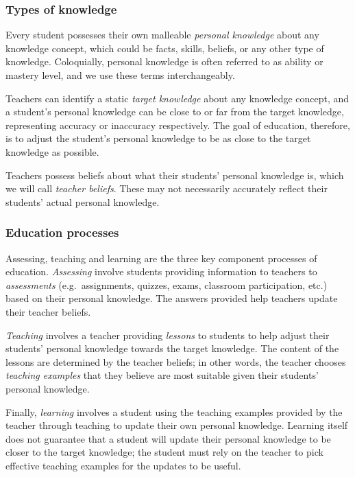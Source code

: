 \documentclass[10pt, letterpaper]{article}
\begin{document}
\subsubsection{Types of knowledge}\label{types-of-knowledge}

Every student possesses their own malleable \emph{personal knowledge}
about any knowledge concept, which could be facts, skills, beliefs, or
any other type of knowledge. Coloquially, personal knowledge is often
referred to as ability or mastery level, and we use these terms
interchangeably.

Teachers can identify a static \emph{target knowledge} about any
knowledge concept, and a student's personal knowledge can be close to or
far from the target knowledge, representing accuracy or inaccuracy
respectively. The goal of education, therefore, is to adjust the
student's personal knowledge to be as close to the target knowledge as
possible.

Teachers possess beliefs about what their students' personal knowledge
is, which we will call \emph{teacher beliefs}. These may not necessarily
accurately reflect their students' actual personal knowledge.

\subsubsection{Education processes}\label{education-processes}

Assessing, teaching and learning are the three key component processes
of education. \emph{Assessing} involve students providing information to
teachers to \emph{assessments} (e.g.~assignments, quizzes, exams,
classroom participation, etc.) based on their personal knowledge. The
answers provided help teachers update their teacher beliefs.

\emph{Teaching} involves a teacher providing \emph{lessons} to students
to help adjust their students' personal knowledge towards the target
knowledge. The content of the lessons are determined by the teacher
beliefs; in other words, the teacher chooses \emph{teaching examples}
that they believe are most suitable given their students' personal
knowledge.

Finally, \emph{learning} involves a student using the teaching examples
provided by the teacher through teaching to update their own personal
knowledge. Learning itself does not guarantee that a student will update
their personal knowledge to be closer to the target knowledge; the
student must rely on the teacher to pick effective teaching examples for
the updates to be useful.
\end{document}

